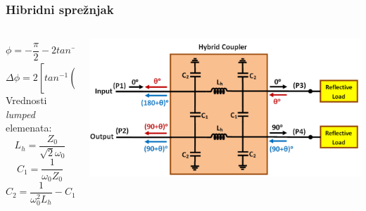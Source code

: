 \documentclass{beamer}
\begin{document}
\begin{frame}
\frametitle{Hibridni sprežnjak}
\begin{columns}
\begin{column}{0.5\textwidth}
   \begin{equation*}
    \phi = - \dfrac{\pi}{2} - 2 tan^{-1}(\dfrac{X}{Z_0})
   \end{equation*}
   \begin{equation*}
    \Delta \phi = 2 [tan^{-1}(\dfrac{Z_{max}}{Z_0}) - tan^{-1}(\dfrac{Z_{min}}{Z_0}) ]
   \end{equation*}
   Vrednosti \textit{lumped} elemenata:
   \begin{equation*}
    L_h = \dfrac{Z_0}{\sqrt{2} \omega_0}
   \end{equation*}
   \begin{equation*}
    C_1 = \dfrac{1}{\omega_0 Z_0} 
   \end{equation*}
   \begin{equation*}
    C_2 = \dfrac{1}{\omega_0^2 L_h} - C_1
   \end{equation*}
\end{column}
\begin{column}{0.5\textwidth}  
    \begin{center}
     \includegraphics[width=\textwidth]{hybrid_coupler.png}
     \end{center}
\end{column}
\end{columns}
\end{frame}
\end{document}
